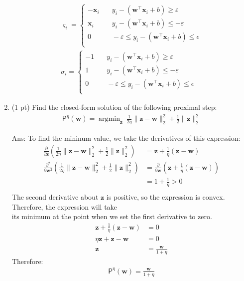 \documentclass[10pt,letter,notitlepage]{article}
\newcommand{\argmin}{\mathop{\mathrm{argmin}}}
\newcommand{\wv}{\mathbf{w}}
\newcommand{\xv}{\mathbf{x}}
\newcommand{\zv}{\mathbf{z}}
\newcommand{\ans}[1]{{\color{orange}\textsf{Ans}: #1}}
\newcounter{exercise}
\begin{document}
\begin{exercise}
\begin{enumerate}
{    \begin{align*}
    \varsigma_i = \left\{
        \begin{array}{ll}
            -\xv_i & \quad y_i - (\wv^\top \xv_i + b ) \ge \varepsilon \\
            \xv_i & \quad  y_i - (\wv^\top \xv_i + b ) \le -\varepsilon\\
            0 & \quad  - \varepsilon \le y_i - (\wv^\top \xv_i + b ) \le \epsilon\\
        \end{array}
    \right. \\
    \sigma_i = \left\{
        \begin{array}{ll}
            -1 & \quad y_i - (\wv^\top \xv_i + b ) \ge \varepsilon \\
            1 & \quad  y_i - (\wv^\top \xv_i + b ) \le -\varepsilon\\
            0 & \quad  - \varepsilon \le y_i - (\wv^\top \xv_i + b ) \le \epsilon\\
        \end{array}
    \right.
  \end{align*}
} 

	
\item (1 pt) Find the closed-form solution of the following proximal step:
	\begin{align}
	\mathsf{P}^\eta(\wv) = \argmin_{\zv} ~ \frac{1}{2\eta} \|\zv - \wv\|_2^2 + \frac{1}{2} \|\zv\|_2^2
	\end{align}
	
	
\ans{
  To find the mininum value, we take the derivatives of this expression:
  \begin{align*}
    \frac{\partial}{\partial{\zv}} \left(\frac{1}{2\eta} \|\zv - \wv\|_2^2 + \frac{1}{2} \|\zv\|_2^2\right) 
    &= \zv + \frac{1}{\eta} (\zv - \wv) \\
     \frac{\partial^2}{\partial{\wv^2}} \left(\frac{1}{2\eta} \|\zv - \wv\|_2^2 + \frac{1}{2} \|\zv\|_2^2\right) 
    &= \frac{\partial}{\partial{\wv}} \left(\zv + \frac{1}{\eta} (\zv - \wv) \right)\\
    &= 1 + \frac{1}{\eta} > 0\\
  \end{align*}
  The second derivative about $\zv$ is positive, so the expression is convex. Therefore, the expression will take \\
  its minimum at the point when we set the first derivative to zero.
  \color{orange}
  \begin{align*}
    \zv + \frac{1}{\eta} (\zv - \wv) &= 0\\
    \eta \zv + \zv - \wv &= 0 \\
    \zv &= \frac{\wv}{1+\eta}
  \end{align*}
  Therefore:
  \begin{align}
	\mathsf{P}^\eta(\wv) = \frac{\wv}{1+\eta}
	\end{align}
} 


\end{enumerate}
\end{exercise}
\end{document}
